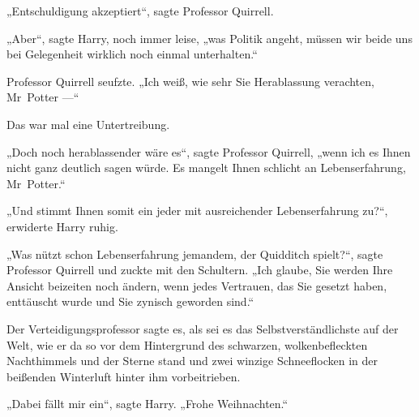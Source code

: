 „Entschuldigung akzeptiert“, sagte Professor Quirrell.

„Aber“, sagte Harry, noch immer leise, „was Politik angeht, müssen wir beide uns bei Gelegenheit wirklich noch einmal unterhalten.“


Professor Quirrell seufzte.
„Ich weiß, wie sehr Sie Herablassung verachten, Mr~Potter —“

Das war mal eine Untertreibung.

„Doch noch herablassender wäre es“, sagte Professor Quirrell, „wenn ich es Ihnen nicht ganz deutlich sagen würde. Es mangelt Ihnen schlicht an Lebenserfahrung, Mr~Potter.“

„Und stimmt Ihnen somit ein jeder mit ausreichender Lebenserfahrung zu?“, erwiderte Harry ruhig.

„Was nützt schon Lebenserfahrung jemandem, der Quidditch spielt?“, sagte Professor Quirrell und zuckte mit den Schultern.
„Ich glaube, Sie werden Ihre Ansicht beizeiten noch ändern, wenn jedes Vertrauen, das Sie gesetzt haben, enttäuscht wurde und Sie zynisch geworden sind.“

Der Verteidigungsprofessor sagte es, als sei es das Selbstverständlichste auf der Welt, wie er da so vor dem Hintergrund des schwarzen, wolkenbefleckten Nachthimmels und der Sterne stand und zwei winzige Schneeflocken in der beißenden Winterluft hinter ihm vorbeitrieben.

„Dabei fällt mir ein“, sagte Harry.
„Frohe Weihnachten.“

